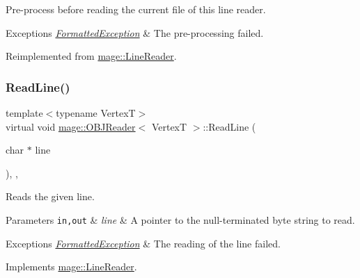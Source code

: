 Pre-\/process before reading the current file of this line reader.


\begin{DoxyExceptions}{Exceptions}
{\em \hyperlink{structmage_1_1_formatted_exception}{Formatted\+Exception}} & The pre-\/processing failed. \\
\hline
\end{DoxyExceptions}


Reimplemented from \hyperlink{classmage_1_1_line_reader_a4de135cfb0434be786cfcfd7959031ef}{mage\+::\+Line\+Reader}.

\hypertarget{classmage_1_1_o_b_j_reader_a8d4bd7be6de3098ba899cc36e3be1283}{}\label{classmage_1_1_o_b_j_reader_a8d4bd7be6de3098ba899cc36e3be1283} 
\subsubsection{\texorpdfstring{Read\+Line()}{ReadLine()}}
{\footnotesize\ttfamily template$<$typename VertexT$>$ \\
virtual void \hyperlink{classmage_1_1_o_b_j_reader}{mage\+::\+O\+B\+J\+Reader}$<$ VertexT $>$\+::Read\+Line (\begin{DoxyParamCaption}\item[{char $\ast$}]{line }\end{DoxyParamCaption})\hspace{0.3cm}{\ttfamily [override]}, {\ttfamily [private]}, {\ttfamily [virtual]}}

Reads the given line.


\begin{DoxyParams}[1]{Parameters}
\mbox{\tt in,out}  & {\em line} & A pointer to the null-\/terminated byte string to read. \\
\hline
\end{DoxyParams}

\begin{DoxyExceptions}{Exceptions}
{\em \hyperlink{structmage_1_1_formatted_exception}{Formatted\+Exception}} & The reading of the line failed. \\
\hline
\end{DoxyExceptions}


Implements \hyperlink{classmage_1_1_line_reader_acfb2f7279ec77d070a86d7db812d4745}{mage\+::\+Line\+Reader}.

\hypertarget{classmage_1_1_o_b_j_reader_a647cd7683007f351096702924ce46a3b}{}\label{classmage_1_1_o_b_j_reader_a647cd7683007f351096702924ce46a3b} 
